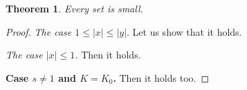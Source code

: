 \documentclass{article}
\newtheorem{theorem}{Theorem}
\begin{document}
\begin{theorem}
Every set is small.
\end{theorem}
\begin{proof}
{\it The case $1\le |x|\le |y|$}. Let us show that it holds.

{\it The case $|x|\le 1$.} Then it holds.

{\bf Case $s \neq 1$ and $K=K_0$.} Then it holds too.
\end{proof}
\end{document}
